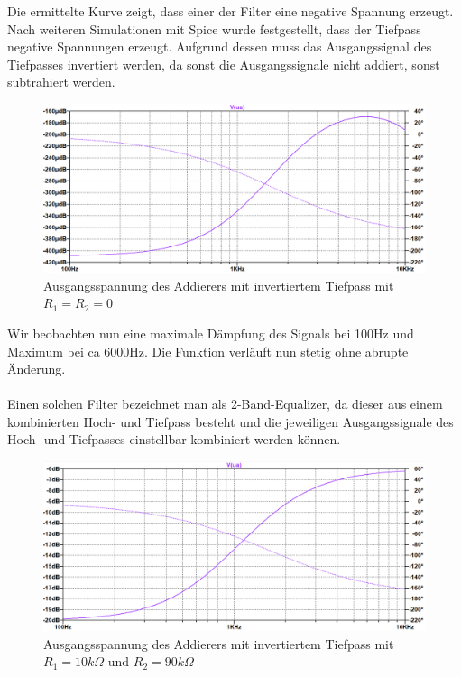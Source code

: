 Die ermittelte Kurve zeigt, dass einer der Filter eine negative Spannung erzeugt. Nach weiteren Simulationen mit Spice wurde festgestellt, dass der Tiefpass negative Spannungen erzeugt. Aufgrund dessen muss das Ausgangssignal des Tiefpasses invertiert werden, da sonst die Ausgangssignale nicht addiert, sonst subtrahiert werden.

\newpage

\begin{figure}[htb]
    \includegraphics[width=16cm]{./pictures/Gesamtschaltung_Invertiert}
    \caption{Ausgangsspannung des Addierers mit invertiertem Tiefpass mit $R_1 = R_2 = 0$}
    \label{fig:AddiererAusgangsspannungInvertiert}
\end{figure}

Wir beobachten nun eine maximale Dämpfung des Signals bei 100Hz und Maximum bei ca 6000Hz. Die Funktion verläuft nun stetig ohne abrupte Änderung.
\\
\\
Einen solchen Filter bezeichnet man als 2-Band-Equalizer, da dieser aus einem kombinierten Hoch- und Tiefpass besteht und die jeweiligen Ausgangssignale des Hoch- und Tiefpasses einstellbar kombiniert werden können.

\begin{figure}[htb]
    \includegraphics[width=16cm]{./pictures/Gesamtschaltung_Invertiert_10_90}
    \caption{Ausgangsspannung des Addierers mit invertiertem Tiefpass mit $R_1 = 10k\Omega$ und $R_2 = 90k\Omega$}
    \label{fig:AddiererAusgangsspannungInvertiert}
\end{figure}

